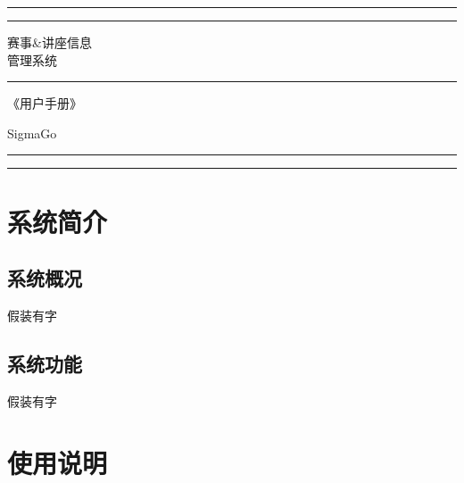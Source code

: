 \documentclass[UTF8]{ctexart}
\date{}
\title{}
\author{}
\begin{document}
\begin{titlepage} 
    \centering     
    \rule{\textwidth}{1pt} 
    \vspace{2pt}\vspace{-\baselineskip} 
    \rule{\textwidth}{0.4pt} 
    \vspace{0.1\textheight} 
    
        {\Huge 赛事\&讲座信息}\\[0.5\baselineskip] 
        {\Huge 管理系统} 
    
    \vspace{0.025\textheight} 
    \rule{0.3\textwidth}{0.4pt} 
    \vspace{0.1\textheight}

        {\huge 《用户手册》} 
    
    \vspace{0.1\textheight}
    
        {\Large SigmaGo}

    \vfill 
    \rule{\textwidth}{0.4pt} 
    \vspace{2pt}\vspace{-\baselineskip} 
    \rule{\textwidth}{1pt}    
\end{titlepage}

\newpage
\tableofcontents


\newpage
\section{系统简介}

\subsection{系统概况}
假装有字
\subsection{系统功能}
假装有字

\newpage
\section{使用说明}
\end{document}
